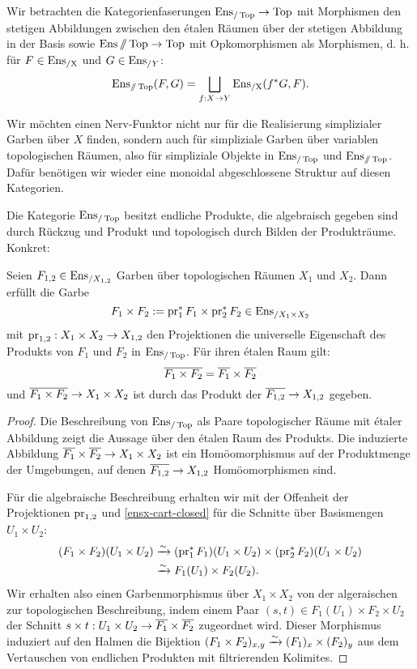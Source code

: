 Wir betrachten die Kategorienfaserungen $\operatorname{Ens}_{/\operatorname{Top}} \to \operatorname{Top}$ mit
Morphismen den stetigen Abbildungen zwischen den étalen Räumen über
der stetigen Abbildung in der Basis sowie $\operatorname{Ens}{\mathbin{/\mkern-6mu/} \operatorname{Top}} \to
\operatorname{Top}$ mit Opkomorphismen als Morphismen, d. h. für $F \in \operatorname{Ens_{/X}}$ und
$G \in \operatorname{Ens}_{/Y}$:
\[ \operatorname{Ens}_{\mathbin{/\mkern-6mu/} \operatorname{Top}}(F, G) = \bigsqcup_{f: X \to Y} \operatorname{Ens_{/X}}(f^* G, F). \]

Wir möchten einen Nerv-Funktor nicht nur für die Realisierung
simplizialer Garben über $X$ finden, sondern auch für simpliziale
Garben über variablen topologischen Räumen, also für simpliziale
Objekte in $\operatorname{Ens}_{/\operatorname{Top}}$ und $\operatorname{Ens}_{\mathbin{/\mkern-6mu/} \operatorname{Top}}$. Dafür benötigen
wir wieder eine monoidal abgeschlossene Struktur auf diesen
Kategorien.

Die Kategorie $\operatorname{Ens}_{/\operatorname{Top}}$ besitzt endliche Produkte, die
algebraisch gegeben sind durch Rückzug und Produkt und topologisch
durch Bilden der Produkträume. Konkret:
\begin{prop}
  Seien $F_{1,2} \in \operatorname{Ens}_{/X_{1,2}}$ Garben über topologischen Räumen
  $X_1$ und $X_2$. Dann erfüllt die Garbe
  \[ F_1 \times F_2 := \operatorname{pr}_1^* F_1 \times \operatorname{pr}_2^* F_2 \in \operatorname{Ens}_{/X_1 \times X_2} \]
  mit $\operatorname{pr}_{1,2}: X_1 \times X_2 \to X_{1,2}$ den Projektionen die
  universelle Eigenschaft des Produkts von $F_1$ und $F_2$ in
  $\operatorname{Ens}_{/\operatorname{Top}}$. Für ihren étalen Raum gilt:
  \[ \overline{F_1 \times F_2} = \overline{F_1} \times \overline{F_2} \]
  und $\overline{F_1 \times F_2} \to X_1 \times X_2$ ist durch das
  Produkt der $\overline{F_{1,2}} \to X_{1,2}$ gegeben.
\end{prop}
\begin{proof}
  Die Beschreibung von $\operatorname{Ens}_{/\operatorname{Top}}$ als Paare topologischer Räume
  mit étaler Abbildung zeigt die Aussage über den étalen Raum des
  Produkts. Die induzierte Abbildung $\overline{F_1}
  \times \overline{F_2} \to X_1 \times X_2$ ist ein Homöomorphismus
  auf der Produktmenge der Umgebungen, auf denen $\overline{F_{1,2}}
  \to X_{1,2}$ Homöomorphismen sind.
  
  Für die algebraische Beschreibung erhalten wir mit der Offenheit der
  Projektionen $\operatorname{pr}_{1,2}$ und \ref{ensx-cart-closed} für die Schnitte
  über Basismengen $U_1 \times U_2$:
  \begin{align*}
    (F_1 \times F_2)(U_1 \times U_2)
    &\xrightarrow[]{\sim} (\operatorname{pr}_1^* F_1)(U_1 \times U_2) \times (\operatorname{pr}_2^* F_2)(U_1 \times U_2) \\
    &\xrightarrow[]{\sim} F_1(U_1) \times F_2(U_2).
  \end{align*}
  Wir erhalten also einen Garbenmorphismus über $X_1 \times X_2$ von
  der algeraischen zur topologischen Beschreibung, indem einem Paar
  $(s, t) \in F_1(U_1) \times F_2 \times U_2$ der Schnitt $s \times t:
  U_1 \times U_2 \to \overline{F_1} \times \overline{F_2}$
  zugeordnet wird. Dieser Morphismus induziert auf den Halmen die
  Bijektion $(F_1 \times F_2)_{x, y} \xrightarrow[]{\sim} (F_1)_x \times (F_2)_y$ aus
  dem Vertauschen von endlichen Produkten mit filtrierenden Kolimites.
\end{proof}

